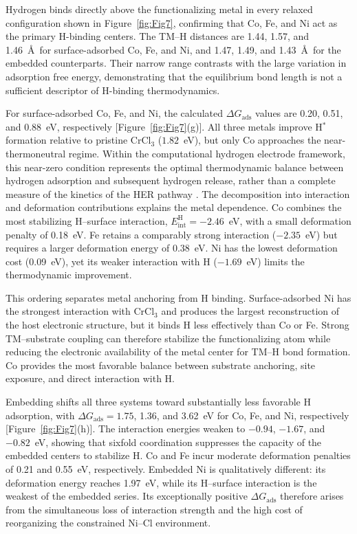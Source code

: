\documentclass[journal=jacsat,manuscript=article]{achemso}
\begin{document}
\noindent Hydrogen binds directly above the functionalizing metal in every relaxed configuration shown in Figure~\ref{fig:Fig7}, confirming that Co, Fe, and Ni act as the primary H-binding centers. The TM--H distances are 1.44, 1.57, and 1.46~\AA\ for surface-adsorbed Co, Fe, and Ni, and 1.47, 1.49, and 1.43~\AA\ for the embedded counterparts. Their narrow range contrasts with the large variation in adsorption free energy, demonstrating that the equilibrium bond length is not a sufficient descriptor of H-binding thermodynamics.

For surface-adsorbed Co, Fe, and Ni, the calculated $\Delta G_{\mathrm{ads}}$ values are 0.20, 0.51, and 0.88~eV, respectively [Figure~\ref{fig:Fig7}(g)]. All three metals improve H$^*$ formation relative to pristine CrCl$_3$ ($1.82$~eV), but only Co approaches the near-thermoneutral regime. Within the computational hydrogen electrode framework, this near-zero condition represents the optimal thermodynamic balance between hydrogen adsorption and subsequent hydrogen release, rather than a complete measure of the kinetics of the HER pathway \cite{Norskov_2005,Liao2022}. The decomposition into interaction and deformation contributions explains the metal dependence. Co combines the most stabilizing H--surface interaction, $E_{\mathrm{int}}^{\mathrm H}=-2.46$~eV, with a small deformation penalty of 0.18~eV. Fe retains a comparably strong interaction ($-2.35$~eV) but requires a larger deformation energy of 0.38~eV. Ni has the lowest deformation cost (0.09~eV), yet its weaker interaction with H ($-1.69$~eV) limits the thermodynamic improvement.

This ordering separates metal anchoring from H binding. Surface-adsorbed Ni has the strongest interaction with CrCl$_3$ and produces the largest reconstruction of the host electronic structure, but it binds H less effectively than Co or Fe. Strong TM--substrate coupling can therefore stabilize the functionalizing atom while reducing the electronic availability of the metal center for TM--H bond formation. Co provides the most favorable balance between substrate anchoring, site exposure, and direct interaction with H.

Embedding shifts all three systems toward substantially less favorable H adsorption, with $\Delta G_{\mathrm{ads}}=1.75$, 1.36, and 3.62~eV for Co, Fe, and Ni, respectively [Figure~\ref{fig:Fig7}(h)]. The interaction energies weaken to $-0.94$, $-1.67$, and $-0.82$~eV, showing that sixfold coordination suppresses the capacity of the embedded centers to stabilize H. Co and Fe incur moderate deformation penalties of 0.21 and 0.55~eV, respectively. Embedded Ni is qualitatively different: its deformation energy reaches 1.97~eV, while its H--surface interaction is the weakest of the embedded series. Its exceptionally positive $\Delta G_{\mathrm{ads}}$ therefore arises from the simultaneous loss of interaction strength and the high cost of reorganizing the constrained Ni--Cl environment.
\end{document}
